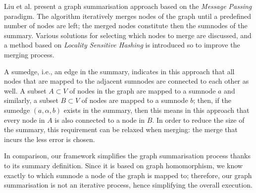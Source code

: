Liu et al. \cite{liu:cikm:2014} present a graph summarisation approach based on the \emph{Message Passing} paradigm. The algorithm iteratively merges nodes of the graph until a predefined number of nodes are left; the merged nodes constitute then the sumnodes of the summary. Various solutions for selecting which nodes to merge are discussed, and a method based on \emph{Locality Sensitive Hashing} \cite{gionis:1999:ssh} is introduced so to improve the merging process.

A sumedge, i.e., an edge in the summary, indicates in this approach that all nodes that are mapped to the adjacent sumnodes are connected to each other as well. A subset $A \subset V$ of nodes in the graph are mapped to a sumnode $a$ and similarly, a subset $B \subset V$ of nodes are mapped to a sumnode $b$; then, if the sumedge $(a,\alpha,b)$ exists in the summary, then this means in this approach that every node in $A$ is also connected to a node in $B$. In order to reduce the size of the summary, this requirement can be relaxed when merging: the merge that incurs the less error is chosen.

In comparison, our framework simplifies the graph summarisation process thanks to its summary definition. Since it is based on graph homomorphism, we know exactly to which sumnode a node of the graph is mapped to; therefore, our graph summarisation is not an iterative process, hence simplifying the overall execution.


